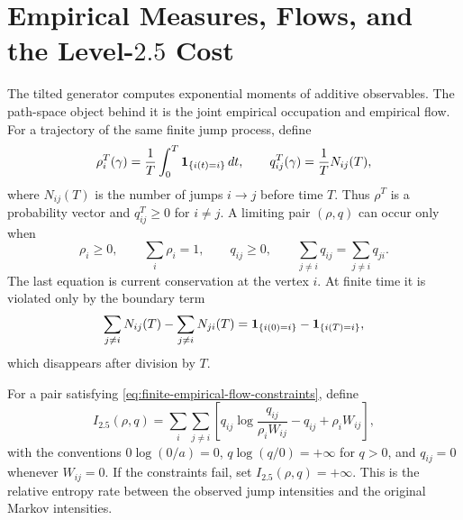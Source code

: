 \section{Empirical Measures, Flows, and the Level-\texorpdfstring{\(2.5\)}{2.5} Cost}
\label{sec:finite-empirical-flow-level-25}

The tilted generator computes exponential moments of additive observables.
The path-space object behind it is the joint empirical occupation and
empirical flow.  For a trajectory of the same finite jump process, define
\begin{equation}
  \rho_i^T(\gamma)
  =
  \frac1T\int_0^T{\bf 1}_{\{i(t)=i\}}\,dt,
  \qquad
  q_{ij}^T(\gamma)
  =
  \frac1T N_{ij}(T),
  \label{eq:finite-empirical-measure-flow}
\end{equation}
where \(N_{ij}(T)\) is the number of jumps \(i\to j\) before time \(T\).
Thus \(\rho^T\) is a probability vector and \(q^T_{ij}\ge0\) for
\(i\ne j\).  A limiting pair \((\rho,q)\) can occur only when
\begin{equation}
  \rho_i\ge0,\qquad \sum_i\rho_i=1,\qquad q_{ij}\ge0,
  \qquad
  \sum_{j\ne i}q_{ij}=\sum_{j\ne i}q_{ji}.
  \label{eq:finite-empirical-flow-constraints}
\end{equation}
The last equation is current conservation at the vertex \(i\).  At finite
time it is violated only by the boundary term
\[
  \sum_{j\ne i}N_{ij}(T)-\sum_{j\ne i}N_{ji}(T)
  =
  {\bf 1}_{\{i(0)=i\}}-{\bf 1}_{\{i(T)=i\}},
\]
which disappears after division by \(T\).

For a pair satisfying \eqref{eq:finite-empirical-flow-constraints}, define
\begin{equation}
  I_{2.5}(\rho,q)
  =
  \sum_{i}\sum_{j\ne i}
  \left[
    q_{ij}\log\frac{q_{ij}}{\rho_iW_{ij}}
    -q_{ij}
    +\rho_iW_{ij}
  \right],
  \label{eq:finite-level-25-rate-function}
\end{equation}
with the conventions \(0\log(0/a)=0\), \(q\log(q/0)=+\infty\) for \(q>0\),
and \(q_{ij}=0\) whenever \(W_{ij}=0\).  If the constraints fail, set
\(I_{2.5}(\rho,q)=+\infty\).  This is the relative entropy rate between the
observed jump intensities and the original Markov intensities.

